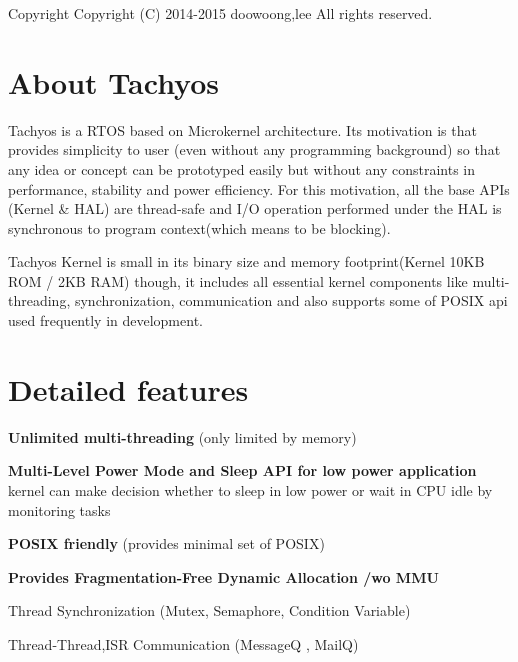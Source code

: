 \begin{DoxyCopyright}{Copyright}
Copyright (C) 2014-\/2015 doowoong,lee All rights reserved. 
\end{DoxyCopyright}
\hypertarget{index_about_sec}{}\section{About Tachyos}\label{index_about_sec}
Tachyos is a R\+T\+O\+S based on Microkernel architecture. Its motivation is that provides simplicity to user (even without any programming background) so that any idea or concept can be prototyped easily but without any constraints in performance, stability and power efficiency. For this motivation, all the base A\+P\+Is (Kernel \& H\+A\+L) are thread-\/safe and I/\+O operation performed under the H\+A\+L is synchronous to program context(which means to be blocking).

Tachyos Kernel is small in its binary size and memory footprint(Kernel 10\+K\+B R\+O\+M / 2\+K\+B R\+A\+M) though, it includes all essential kernel components like multi-\/threading, synchronization, communication and also supports some of P\+O\+S\+I\+X api used frequently in development.\hypertarget{index_feat_sec}{}\section{Detailed features}\label{index_feat_sec}
\begin{DoxyItemize}
\item {\bfseries Unlimited multi-\/threading} (only limited by memory) \item {\bfseries Multi-\/\+Level Power Mode and Sleep A\+P\+I for low power application} {\ttfamily kernel} can make decision whether to sleep in low power or wait in C\+P\+U idle by monitoring tasks \item {\bfseries P\+O\+S\+I\+X friendly} (provides minimal set of P\+O\+S\+I\+X) \item {\bfseries Provides Fragmentation-\/\+Free Dynamic Allocation /wo M\+M\+U} \item Thread Synchronization (Mutex, Semaphore, Condition Variable) \item Thread-\/\+Thread,I\+S\+R Communication (Message\+Q , Mail\+Q) \end{DoxyItemize}
